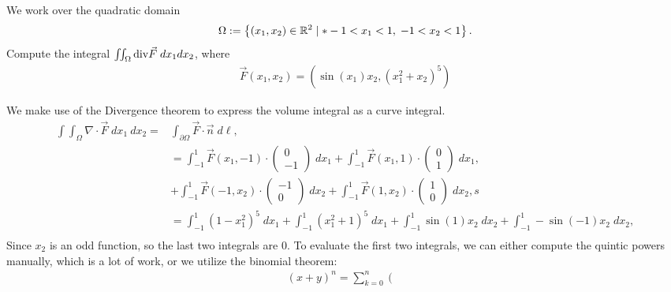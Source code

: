 \documentclass[11pt]{article}
\begin{document}
\begin{exercise}
    We work over the quadratic domain 
    \begin{gather*}
        \Omega := \left\{ (x_1,x_2) \in \bbR^{2} \suchthat* -1 < x_1 < 1, \; -1 < x_2 < 1 \right\}.
    \end{gather*}
    Compute the integral $\iint_\Omega \mathrm{div} \vec F \;dx_1dx_2$, where 
    \begin{gather*}
        \vec F(x_1,x_2) = \left( \sin(x_1) x_2, \left( x_1^2 + x_2 \right)^5 \right)
    \end{gather*}
\end{exercise}
\begin{solution}
    We make use of the Divergence theorem to express the volume integral as a curve integral.
    \begin{align*}
        \int \int_{\Omega} \nabla \cdot \vec{F} \;d x_1 \:d x_2 
        =
        &
        \int_{\partial \Omega}\vec{F}\cdot\vec{n} \;d\ell,
        \\&=
        \int_{-1}^1 \vec{F}(x_1,-1)\cdot\begin{pmatrix}0\\-1\end{pmatrix} \;dx_1 + \int_{-1}^1 \vec{F}(x_1,1)\cdot\begin{pmatrix}0\\1\end{pmatrix} \;dx_1,
        \\
        & + \int_{-1}^1 \vec{F}(-1,x_2)\cdot\begin{pmatrix}-1\\0\end{pmatrix} \;dx_2 + \int_{-1}^1 \vec{F}(1,x_2)\cdot\begin{pmatrix}1\\0\end{pmatrix} \;dx_2,s
        \\&=
        \int_{-1}^1 (1-x_1^ 2)^ 5 \;dx_1 + \int_{-1}^1 (x_1^2 + 1)^ 5 \;dx_1 + \int_{-1}^1 \sin(1)x_2\;dx_2 +  \int_{-1}^1 -\sin(-1)x_2\;dx_2,\\
    \end{align*}
    Since $x_2$ is an odd function, so the last two integrals are 0. To evaluate the first two integrals,
    we can either compute the quintic powers manually, which is a lot of work, or we utilize the binomial theorem:
    \begin{gather*}
        (x+y)^n=\sum_{k=0}^n\left(\begin{array}{l}

\end{array}
\end{gather*}
\end{solution}
\end{document}
